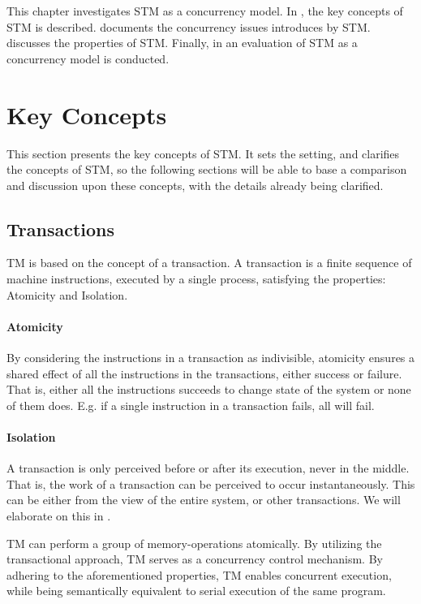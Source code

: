 \makeatletter {}\makeatother
{}
This chapter investigates \ac{STM} as a concurrency model. In , the key concepts of \ac{STM} is described.  documents the concurrency issues introduces by \ac{STM}.  discusses the properties of \ac{STM}. Finally, in  an evaluation of \ac{STM} as a concurrency model is conducted.
\label{chap:stm}
\section{Key Concepts}
\label{sec:stm_keyconcepts}
This section presents the key concepts of \ac{STM}. It sets the setting, and clarifies the concepts of \ac{STM}, so the following sections will be able to base a comparison and discussion upon these concepts, with the details already being clarified.

\subsection{Transactions}
\ac{TM} is based on the concept of a transaction. A transaction is a finite sequence of machine instructions, executed by a single process, satisfying the properties: Atomicity and Isolation\cite[p. 2]{herlihy2011tm}.

\paragraph{Atomicity} By considering the instructions in a transaction as indivisible, atomicity ensures a shared effect of all the instructions in the transactions, either success or failure. That is, either all the instructions succeeds to change state of the system or none of them does. E.g. if a single instruction in a transaction fails, all will fail.
\paragraph{Isolation} A transaction is only perceived before or after its execution, never in the middle. That is, the work of a transaction can be perceived to occur instantaneously. This can be either from the view of the entire system, or other transactions. We will elaborate on this in .

\ac{TM} can perform a group of memory-operations atomically\cite[48]{harris2005composable}. By utilizing the transactional approach, \ac{TM} serves as a concurrency control mechanism. By adhering to the aforementioned properties, \ac{TM} enables concurrent execution, while being semantically equivalent to serial execution of the same program.

